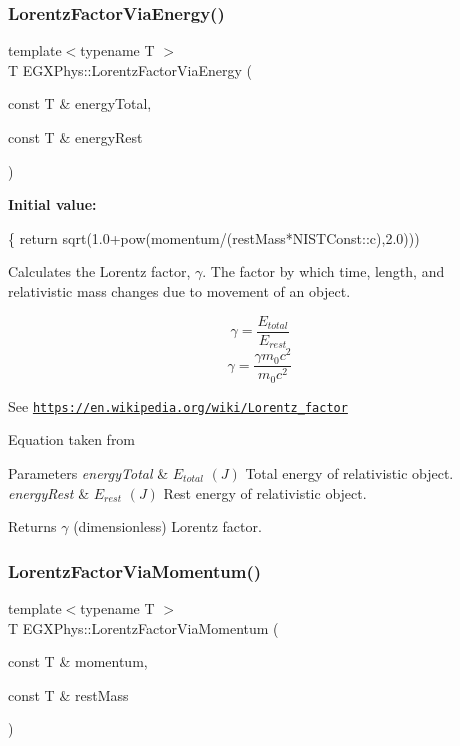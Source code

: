 \subsubsection{\texorpdfstring{Lorentz\+Factor\+Via\+Energy()}{LorentzFactorViaEnergy()}}
{\footnotesize\ttfamily template$<$typename T $>$ \\
T E\+G\+X\+Phys\+::\+Lorentz\+Factor\+Via\+Energy (\begin{DoxyParamCaption}\item[{const T \&}]{energy\+Total,  }\item[{const T \&}]{energy\+Rest }\end{DoxyParamCaption})}

{\bfseries Initial value\+:}
\begin{DoxyCode}
\{
        \textcolor{keywordflow}{return} sqrt(1.0+pow(momentum/(restMass*NISTConst::c),2.0)))
\end{DoxyCode}


Calculates the Lorentz factor, $\gamma$. The factor by which time, length, and relativistic mass changes due to movement of an object. 

\[\gamma=\frac{E_{total}}{E_{rest}}\] \[\gamma=\frac{\gamma m_0 c^2}{m_0 c^2}\]

See \href{https://en.wikipedia.org/wiki/Lorentz_factor}{\tt https\+://en.\+wikipedia.\+org/wiki/\+Lorentz\+\_\+factor}

Equation taken from


\begin{DoxyParams}{Parameters}
{\em energy\+Total} & $E_{total}$ $(J)$ Total energy of relativistic object. \\
\hline
{\em energy\+Rest} & $E_{rest}$ $(J)$ Rest energy of relativistic object. \\
\hline
\end{DoxyParams}
\begin{DoxyReturn}{Returns}
$\gamma$ (dimensionless) Lorentz factor. 
\end{DoxyReturn}
\mbox{\label{group___relativity_ga1ea24128654ac333dd843afdd5c003b7}} 
\subsubsection{\texorpdfstring{Lorentz\+Factor\+Via\+Momentum()}{LorentzFactorViaMomentum()}}
{\footnotesize\ttfamily template$<$typename T $>$ \\
T E\+G\+X\+Phys\+::\+Lorentz\+Factor\+Via\+Momentum (\begin{DoxyParamCaption}\item[{const T \&}]{momentum,  }\item[{const T \&}]{rest\+Mass }\end{DoxyParamCaption})}




